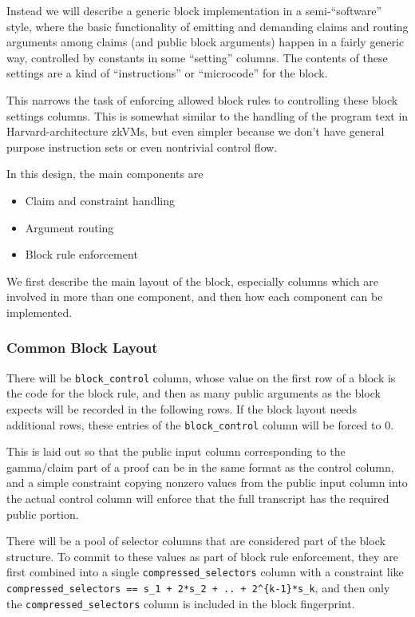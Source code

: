 \documentclass{article}
\theoremstyle{plain}
\theoremstyle{definition}
\begin{document}
Instead we will describe a generic block implementation in a
semi-``software'' style, where the basic functionality of emitting and
demanding claims and routing arguments among claims (and public block
arguments) happen in a fairly generic way, controlled by constants in
some ``setting'' columns. The contents of these settings are a kind of
``instructions'' or ``microcode'' for the block.

This narrows the task of enforcing allowed block rules to controlling
these block settings columns. This is somewhat similar to the handling
of the program text in Harvard-architecture zkVMs, but even simpler
because we don't have general purpose instruction sets or even
nontrivial control flow.

In this design, the main components are 

\begin{itemize}
    \item Claim and constraint handling
    \item Argument routing
    \item Block rule enforcement
\end{itemize}

We first describe the main layout of the block, especially columns which
are involved in more than one component, and then how each component can
be implemented.

\subsubsection{Common Block Layout}\label{common-block-layout}

There will be \texttt{block\_control} column, whose value on the first
row of a block is the code for the block rule, and then as many public
arguments as the block expects will be recorded in the following rows.
If the block layout needs additional rows, these entries of the
\texttt{block\_control} column will be forced to $0$.

This is laid out so that the public input column corresponding to the
gamma/claim part of a proof can be in the same format as the control
column, and a simple constraint copying nonzero values from the
public input column into the actual control column will enforce that
the full transcript has the required public portion.

There will be a pool of selector columns that are considered part of the
block structure. To commit to these values as part of block rule
enforcement, they are first combined into a single
\texttt{compressed\_selectors} column with a constraint like
\texttt{compressed\_selectors\ ==\ s\_1\ +\ 2*s\_2\ +\ ..\ +\ 2\^{}\{k-1\}*s\_k},
and then only the \texttt{compressed\_selectors} column is included in
the block fingerprint.
\end{document}
